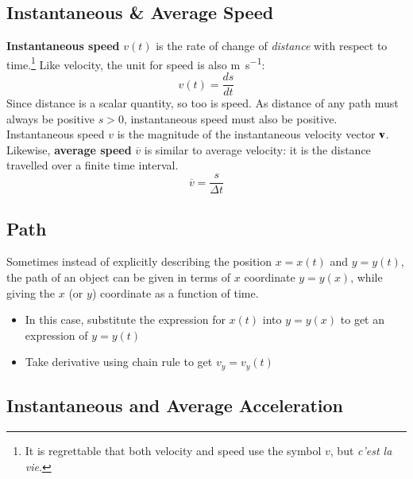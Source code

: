 \documentclass[11pt]{article}
\newcommand{\mb}[1]{\ensuremath\mathbf{#1}}
\begin{document}
\subsection{Instantaneous \& Average Speed}
\textbf{Instantaneous speed} $v(t)$ is the rate of change of \emph{distance}
with respect to time.\footnote{It is regrettable that both velocity and speed
  use the symbol $v$, but \emph{c'est la vie}.} Like velocity, the unit for
speed is also \si{\metre\per\second}:
\begin{equation*}
  \boxed{v(t)=\frac{ds}{dt}}
\end{equation*}
Since distance is a scalar quantity, so too is speed. As distance of any path
must always be positive $s>0$, instantaneous speed must also be positive.
Instantaneous speed $v$ is the magnitude of the instantaneous velocity vector
$\mb{v}$. Likewise, \textbf{average speed} $\overline{v}$ is similar to average
velocity: it is the distance travelled over a finite time interval.
\begin{equation*}
  \boxed{\overline{v}=\frac{s}{\Delta t}}
\end{equation*}

\subsection{Path}
Sometimes instead of explicitly describing the position $x=x(t)$ and $y=y(t)$,
the path of an object can be given in terms of $x$ coordinate $y=y(x)$, while
giving the $x$ (or $y$) coordinate as a function of time.
\begin{itemize}
\item In this case, substitute the expression for $x(t)$ into $y=y(x)$ to
  get an expression of $y=y(t)$
\item Take derivative using chain rule to get $v_y=v_y(t)$
\end{itemize}


\subsection{Instantaneous and Average Acceleration}
\end{document}
